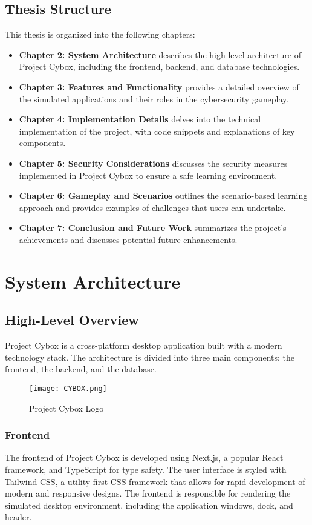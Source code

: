 \documentclass{report}
\begin{document}
\section{Thesis Structure}
This thesis is organized into the following chapters:
\begin{itemize}
    \item \textbf{Chapter 2: System Architecture} describes the high-level architecture of Project Cybox, including the frontend, backend, and database technologies.
    \item \textbf{Chapter 3: Features and Functionality} provides a detailed overview of the simulated applications and their roles in the cybersecurity gameplay.
    \item \textbf{Chapter 4: Implementation Details} delves into the technical implementation of the project, with code snippets and explanations of key components.
    \item \textbf{Chapter 5: Security Considerations} discusses the security measures implemented in Project Cybox to ensure a safe learning environment.
    \item \textbf{Chapter 6: Gameplay and Scenarios} outlines the scenario-based learning approach and provides examples of challenges that users can undertake.
    \item \textbf{Chapter 7: Conclusion and Future Work} summarizes the project's achievements and discusses potential future enhancements.
\end{itemize}

\chapter{System Architecture}

\section{High-Level Overview}
Project Cybox is a cross-platform desktop application built with a modern technology stack. The architecture is divided into three main components: the frontend, the backend, and the database.

\begin{figure}[h]
    \centering
    \texttt{[image: CYBOX.png]}
    \caption{Project Cybox Logo}
    \label{fig:logo}
\end{figure}

\subsection{Frontend}
The frontend of Project Cybox is developed using Next.js, a popular React framework, and TypeScript for type safety. The user interface is styled with Tailwind CSS, a utility-first CSS framework that allows for rapid development of modern and responsive designs. The frontend is responsible for rendering the simulated desktop environment, including the application windows, dock, and header.
\end{document}
